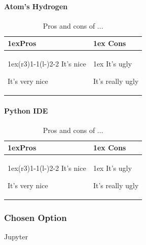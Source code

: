 \documentclass{article}
\begin{document}
    \paragraph{Atom's Hydrogen}
    \begin{table}[H]
    \begin{tabularx}{\linewidth}{>{\parskip1ex}X@{\kern4\tabcolsep}>{\parskip1ex}X}
    \toprule
    \hfil\bfseries Pros
    &
    \hfil\bfseries Cons
    \\\cmidrule(r{3\tabcolsep}){1-1}\cmidrule(l{-\tabcolsep}){2-2}
    It's nice\par
    It's very nice\par
    &
    It's ugly\par
    It's really ugly\par
    \\\bottomrule
    \end{tabularx}
    \caption{Pros and cons of ...}
    \end{table}
    \paragraph{Python IDE}
    \begin{table}
    \begin{tabularx}{\linewidth}{>{\parskip1ex}X@{\kern4\tabcolsep}>{\parskip1ex}X}
    \toprule
    \hfil\bfseries Pros
    &
    \hfil\bfseries Cons
    \\\cmidrule(r{3\tabcolsep}){1-1}\cmidrule(l{-\tabcolsep}){2-2}
    It's nice\par
    It's very nice\par
    &
    It's ugly\par
    It's really ugly\par
    \\\bottomrule
    \end{tabularx}
    \caption{Pros and cons of ...}
    \end{table}


        \subsubsection{Chosen Option}
        Jupyter
\end{document}
